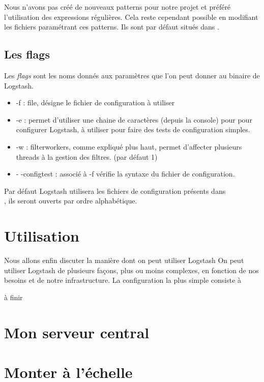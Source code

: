 Nous n'avons pas créé de nouveaux patterns pour notre projet et préféré l'utilisation
des expressions régulières. Cela reste cependant possible en modifiant les fichiers 
paramétrant ces patterns. Ils sont par défaut situés dans .



\subsection{Les flags}
Les \emph{flags} sont les noms donnés aux paramètres que l'on peut donner au binaire
de Logstash.

\begin{itemize}
    \item -f : file, désigne le fichier de configuration à utiliser
    \item -e : permet d'utiliser une chaine de caractères (depuis la console) pour
    pour configurer Logstash, à utiliser pour faire des tests de configuration simples.
    \item -w : filterworkers, comme expliqué plus haut, permet d'affecter plusieurs
    threads à la gestion des filtres. (par défaut 1)
    \item - -configtest : associé à -f  vérifie la syntaxe 
    du fichier de configuration.
\end{itemize}

Par défaut Logstash utilisera les fichiers de configuration présents dans \\ 
, ils seront ouverts par ordre alphabétique.


\section{Utilisation}
Nous allons enfin discuter la manière dont on peut utiliser Logstash
On peut utiliser Logstash de plusieurs façons, plus ou moins complexes, 
en fonction de nos besoins et de notre infrastructure.
La configuration la plus simple consiste à 

{\huge à finir}

\section{Mon serveur central}



\section{Monter à l'échelle}




